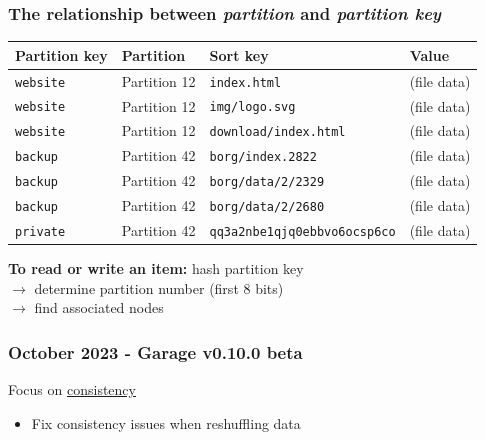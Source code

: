 \documentclass[aspectratio=169]{beamer}
\begin{document}
\begin{frame}
	\frametitle{The relationship between \emph{partition} and \emph{partition key}}
	\begin{center}
	\begin{tabular}{|l|l|l|l|}
		\hline
		\textbf{Partition key} & \textbf{Partition} & \textbf{Sort key} & \textbf{Value} \\
		\hline
		\hline
		\texttt{website} & Partition 12 & \texttt{index.html} & (file data) \\
		\hline
		\texttt{website} & Partition 12 & \texttt{img/logo.svg} & (file data) \\
		\hline
		\texttt{website} & Partition 12 &\texttt{download/index.html} & (file data) \\
		\hline
		\hline
		\texttt{backup} & Partition 42 & \texttt{borg/index.2822} & (file data) \\
		\hline
		\texttt{backup} & Partition 42 & \texttt{borg/data/2/2329} & (file data) \\
		\hline
		\texttt{backup} & Partition 42 & \texttt{borg/data/2/2680} & (file data) \\
		\hline
		\hline
		\texttt{private} & Partition 42 & \texttt{qq3a2nbe1qjq0ebbvo6ocsp6co} & (file data) \\
		\hline
	\end{tabular}
	\end{center}
	\vspace{1em}
	\textbf{To read or write an item:} hash partition key
	\\ \hspace{5cm} $\to$ determine partition number (first 8 bits)
	\\ \hspace{5cm} $\to$ find associated nodes
\end{frame}


\begin{frame}
	\frametitle{October 2023 - Garage v0.10.0 beta}
	Focus on \underline{consistency}
	\vspace{2em}
	\begin{itemize}
		\item Fix consistency issues when reshuffling data
	\end{itemize}
\end{frame}




\end{document}
